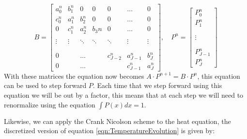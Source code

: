 \begin{equation}
B =
\begin{bmatrix}
	a_0^{n} & b_1^{n}     & 0                 & 0          & 0                    & \dots            & 0        \\
	c_0^{n} & a_1^{n}     & b_2^{n}      & 0          & 0                    & \dots            & 0        \\
	0                & c_1^{n} & a_2^{n}      & b_3{n} & 0                    & \dots            & 0        \\
			     &               &                   &             &                      &                     &           \\
	\vdots         & \vdots     & \ddots         & \ddots   & \ddots            & \vdots           & \vdots \\
			     &               &                   &             &                      &                     &           \\
			     &               &                   &             &                      &                     &           \\
	0                &               & \dots           &             &  c_{J-2}^{n} & a_{J-1}^{n}  & b_J^{n} \\
	0                &               & \dots           &             &                     &  c_{J-1}^{n} & a_J^{n}
\end{bmatrix}
,\quad P^{n} =
\begin{bmatrix}
P_0^{n}       \\
P_1^n          \\
                    \\
                    \\
\vdots           \\
                    \\
                    \\
P_{J-1}^{n} \\
P_J^{n}
\end{bmatrix}
\end{equation}
With these matrices the equation now becomes $A \cdot P^{n+1} = B \cdot P^n$, this equation can be used to step forward $P$.
Each time that we step forward using this equation we will be out by a factor, this means that at each step we will need to renormalize using the equation $\int P(x) dx = 1$.

Likewise, we can apply the Crank Nicolson scheme to the heat equation, the discretized version of equation \ref{eqn:TemperatureEvolution} is given by:

